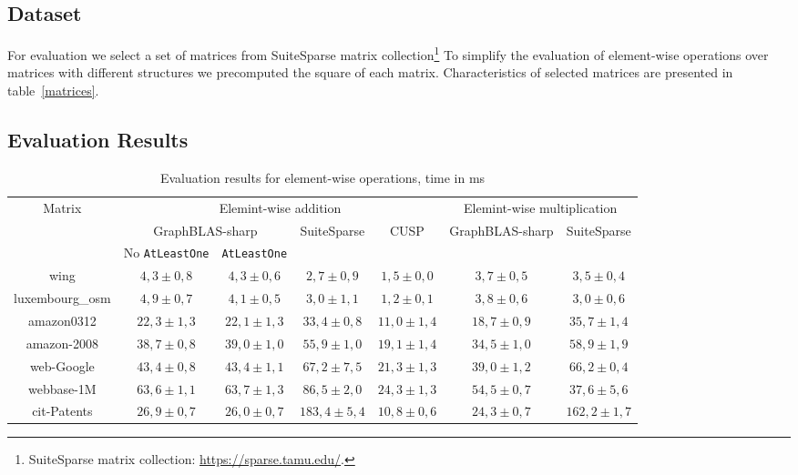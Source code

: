 \subsection {Dataset}

For evaluation we select a set of matrices from SuiteSparse matrix collection\footnote{SuiteSparse matrix collection: \url{https://sparse.tamu.edu/}.}
To simplify the evaluation of element-wise operations over matrices with different structures we precomputed the square of each matrix.
Characteristics of selected matrices are presented in table~\ref{matrices}.

\subsection{Evaluation Results}

\begin{table*}[h]
    \centering    
    \caption{Evaluation results for element-wise operations, time in ms}    
    \label{perf-comparison}
    \begin{tabular}{|c||c|c|c|c||c|c|}
    \hline
    \multirow{3}{*}{Matrix} & \multicolumn{4}{c||}{Elemint-wise addition} & \multicolumn{2}{c|}{Elemint-wise multiplication}\\    
    \cline{2-7}        
    & \multicolumn{2}{c|}{GraphBLAS-sharp} & \multirow{2}{*}{SuiteSparse} & \multirow{2}{*}{CUSP} & \multirow{2}{*}{GraphBLAS-sharp} & \multirow{2}{*}{SuiteSparse}        \\
    &No \texttt{AtLeastOne}&\texttt{AtLeastOne}& & & &\\ 
    \hline
    \hline
    wing            & $4,3 \pm 0,8$       & $4,3 \pm 0,6$      & $2,7\pm 0,9$   & $1,5\pm 0,0$   & $3,7 \pm 0,5$      & $3,5\pm 0,4$\\
    \hline
    luxembourg\_osm & $4,9 \pm 0,7$       & $4,1 \pm 0,5$      & $3,0\pm 1,1$   & $1,2\pm 0,1$  & $3,8 \pm 0,6$      & $3,0\pm 0,6$ \\
    \hline
    amazon0312      & $22,3 \pm 1,3$       & $22,1 \pm 1,3$      & $33,4\pm 0,8$  & $11,0\pm 1,4$  & $18,7 \pm 0,9$      & $35,7\pm 1,4$ \\
    \hline
    amazon-2008     & $38,7 \pm 0,8$       & $39,0 \pm 1,0$     & $55,9\pm 1,0$  & $19,1\pm 1,4$ & $34,5 \pm 1,0$     & $58,9\pm 1,9$  \\
    \hline
    web-Google      & $43,4 \pm 0,8$       & $43,4 \pm 1,1$     & $67,2\pm 7,5$  & $21,3\pm 1,3$  & $39,0 \pm 1,2$     & $66,2\pm 0,4$ \\
    \hline
    webbase-1M      & $63,6 \pm 1,1$      & $63,7 \pm 1,3$      & $86,5\pm 2,0$  & $24,3\pm 1,3$  & $54,5 \pm 0,7$      & $37,6\pm 5,6$ \\
    \hline
    cit-Patents     & $26,9 \pm 0,7$      & $26,0 \pm 0,7$      & $183,4\pm 5,4$ & $10,8\pm 0,6$   & $24,3 \pm 0,7$      & $162,2\pm 1,7$ \\     
    \hline
    \end{tabular}    
\end{table*}

